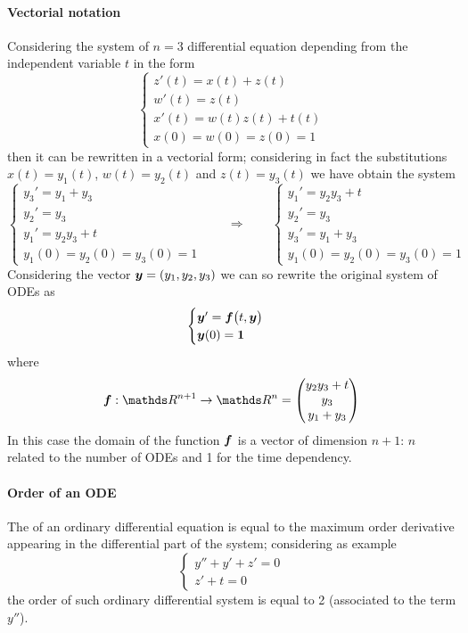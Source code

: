 	\paragraph{Vectorial notation} Considering the system of $n=3$ differential equation depending from the independent variable $t$ in the form
	\[ \begin{cases}
		z'(t) = x(t) + z(t) \\ w'(t) = z(t) \\ x'(t) = w(t)z(t) + t(t) \\ x(0) = w(0) = z(0) = 1
	\end{cases} \]
	then it can be rewritten in a vectorial form; considering in fact the substitutions $x(t) = y_1(t)$, $w(t) = y_2(t)$ and $z(t) = y_3(t)$ we have obtain the system
	\[ \begin{cases}
		y_3' = y_1 + y_3 \\
		y_2' = y_3 \\ 
		y_1' = y_2y_3 + t \\ y_1(0) = y_2(0) = y_3(0) = 1
	\end{cases} \qquad \Rightarrow \qquad \begin{cases}
		y_1' = y_2y_3 + t \\
		y_2' = y_3 \\  
		y_3' = y_1 + y_3 \\
		y_1(0) = y_2(0) = y_3(0) = 1
	\end{cases}\]
	Considering the vector $\boldsymbol{y} = (y_1,y_2, y_3)$ we can so rewrite the original system of ODEs as
	\begin{equation}
		\begin{cases}
			\boldsymbol{y}' = \boldsymbol{f} \big(t, \boldsymbol{y}\big) \\ \boldsymbol{y}(0) = \boldsymbol{1}
		\end{cases}
	\end{equation}
	where
	\[ \vett f : \mathds R^{n+1} \rightarrow \mathds R^n = \begin{pmatrix}
		y_2 y_3 + t \\ y_3 \\ y_1 + y_3
	\end{pmatrix} \]
	In this case the domain of the function $\boldsymbol{f}$ is a vector of dimension $n+1$: $n$ related to the number of ODEs and 1 for the time dependency.
	
	\paragraph{Order of an ODE} The  of an ordinary differential equation is equal to the maximum order derivative appearing in the differential part of the system; considering as example
	\[ \begin{cases}
		y'' + y' + z' = 0 \\ z' + t = 0
	\end{cases} \]
	the order of such ordinary differential system is equal to 2 (associated to the term $y''$). 
	
